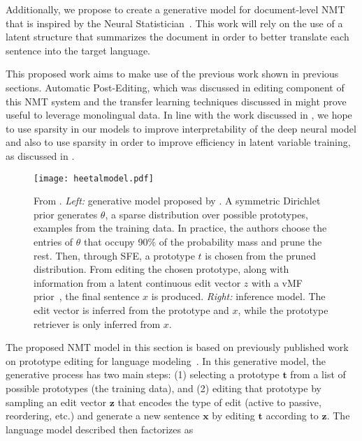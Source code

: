 Additionally, we propose to create a generative model for
document-level NMT that is inspired by the Neural
Statistician~\citep{edwards2017prociclr}. This work will rely on the
use of a latent structure that summarizes the document in order to
better translate each sentence into the target language.

This proposed work aims to make use of the previous work shown in
previous sections. Automatic Post-Editing, which was discussed in
editing component of this NMT system and the transfer learning
techniques discussed in  might prove useful to leverage
monolingual data. In line with the work discussed in
, we hope to use sparsity in our models to
improve interpretability of the deep neural model and also to use
sparsity in order to improve efficiency in latent variable training,
as discussed in .


\begin{figure}[t]
    \centering
    \texttt{[image: heetalmodel.pdf]}
    \caption{From \citet{he2020LearningSparsePrototypes}. {\it Left:}
    generative model proposed by
    \citet{he2020LearningSparsePrototypes}. A symmetric Dirichlet
    prior generates $\theta$, a sparse distribution over possible
    prototypes, \ie examples from the training data. In practice, the
    authors choose the entries of $\theta$ that occupy 90\% of the
    probability mass and prune the rest. Then, through SFE, a
    prototype $t$ is chosen from the pruned distribution. From
    editing the chosen prototype, along with information from a
    latent continuous edit vector $z$ with a vMF
    prior~\citep{s-vae18}, the final sentence
    $x$ is produced. {\it Right:} inference model. The edit
    vector is inferred from the prototype and $x$, while the
    prototype retriever is only inferred from $x$.
    \label{fig:he2020LearningSparsePrototypes}}
\end{figure}

The proposed NMT model in this section is based on previously
published work on prototype editing for language
modeling~\citep{guu2018GeneratingSentencesEditing,
    he2020LearningSparsePrototypes}. In this generative model, the
generative process has two main steps: (1) selecting a prototype
$\bm{t}$ from a list of possible prototypes (\eg the training data),
and (2) editing that prototype by sampling an edit vector $\bm{z}$
that encodes the type of edit (\eg active to passive, reordering,
etc.) and generate a new sentence $\bm{x}$ by editing $\bm{t}$
according to $\bm{z}$. The language model described then factorizes
as


